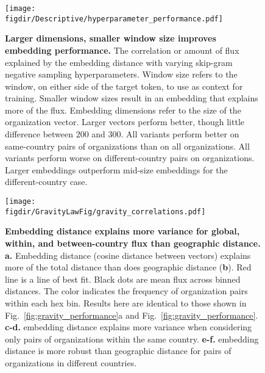 \documentclass[12pt]{article} %
\def\figdir{../Figs}
\begin{document}
%
%
\begin{figure}[p!]
    \centering
    \label{fig:supp:hyperparams}
    \texttt{[image: \\figdir/Descriptive/hyperparameter\_performance.pdf]}
    \caption{
        \textbf{Larger dimensions, smaller window size improves embedding performance.}
        The correlation or amount of flux explained by the embedding distance with varying skip-gram negative sampling hyperparameters. 
        Window size refers to the window, on either side of the target token, to use as context for training. 
        Smaller window sizes result in an embedding that explains more of the flux. 
        Embedding dimensions refer to the size of the organization vector.
        Larger vectors perform better, though little difference between 200 and 300. 
        All variants perform better on same-country pairs of organizations than on all organizations.
        All variants perform worse on different-country pairs on organizations.
        Larger embeddings outperform mid-size embeddings for the different-country case.
    }
\end{figure}

\newpage
%
%
\begin{figure}[p!]
    \centering
    \label{fig:supp:gravity_correlation}
    \texttt{[image: \\figdir/GravityLawFig/gravity\_correlations.pdf]}
    \caption{
        \textbf{Embedding distance explains more variance for global, within, and between-country flux than geographic distance.}
        \textbf{a.}
        Embedding distance (cosine distance between vectors) explains more of the total distance than does geographic distance (\textbf{b}). 
        Red line is a line of best fit. 
        Black dots are mean flux across binned distances.
        The color indicates the frequency of organization pairs within each hex bin.
        Results here are identical to those shown in Fig.~\ref{fig:gravity_performance}a and Fig.~\ref{fig:gravity_performance}.
        \textbf{c-d.}    embedding distance explains more variance when considering only pairs of organizations within the same country. 
        \textbf{e-f.} embedding distance is more robust than geographic distance for pairs of organizations in different countries. 
    }
\end{figure}
\end{document}
